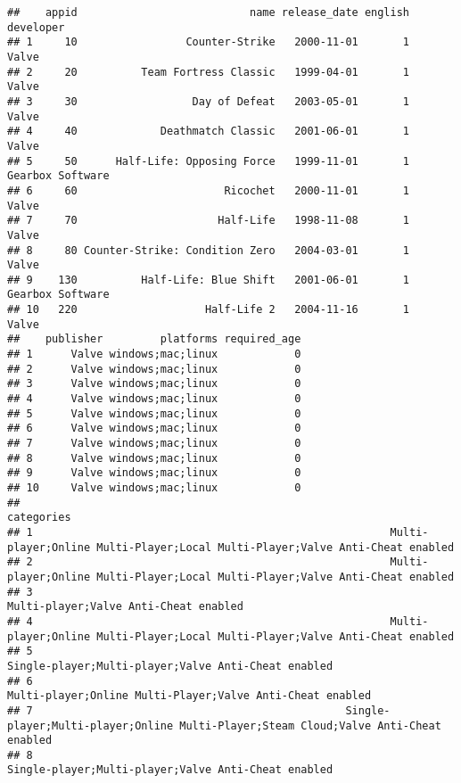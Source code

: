 \documentclass[
]{article}
\begin{document}
\begin{verbatim}
##    appid                           name release_date english        developer
## 1     10                 Counter-Strike   2000-11-01       1            Valve
## 2     20          Team Fortress Classic   1999-04-01       1            Valve
## 3     30                  Day of Defeat   2003-05-01       1            Valve
## 4     40             Deathmatch Classic   2001-06-01       1            Valve
## 5     50      Half-Life: Opposing Force   1999-11-01       1 Gearbox Software
## 6     60                       Ricochet   2000-11-01       1            Valve
## 7     70                      Half-Life   1998-11-08       1            Valve
## 8     80 Counter-Strike: Condition Zero   2004-03-01       1            Valve
## 9    130          Half-Life: Blue Shift   2001-06-01       1 Gearbox Software
## 10   220                    Half-Life 2   2004-11-16       1            Valve
##    publisher         platforms required_age
## 1      Valve windows;mac;linux            0
## 2      Valve windows;mac;linux            0
## 3      Valve windows;mac;linux            0
## 4      Valve windows;mac;linux            0
## 5      Valve windows;mac;linux            0
## 6      Valve windows;mac;linux            0
## 7      Valve windows;mac;linux            0
## 8      Valve windows;mac;linux            0
## 9      Valve windows;mac;linux            0
## 10     Valve windows;mac;linux            0
##                                                                                                                            categories
## 1                                                        Multi-player;Online Multi-Player;Local Multi-Player;Valve Anti-Cheat enabled
## 2                                                        Multi-player;Online Multi-Player;Local Multi-Player;Valve Anti-Cheat enabled
## 3                                                                                               Multi-player;Valve Anti-Cheat enabled
## 4                                                        Multi-player;Online Multi-Player;Local Multi-Player;Valve Anti-Cheat enabled
## 5                                                                                 Single-player;Multi-player;Valve Anti-Cheat enabled
## 6                                                                           Multi-player;Online Multi-Player;Valve Anti-Cheat enabled
## 7                                                 Single-player;Multi-player;Online Multi-Player;Steam Cloud;Valve Anti-Cheat enabled
## 8                                                                                 Single-player;Multi-player;Valve Anti-Cheat enabled

\end{verbatim}
\end{document}
